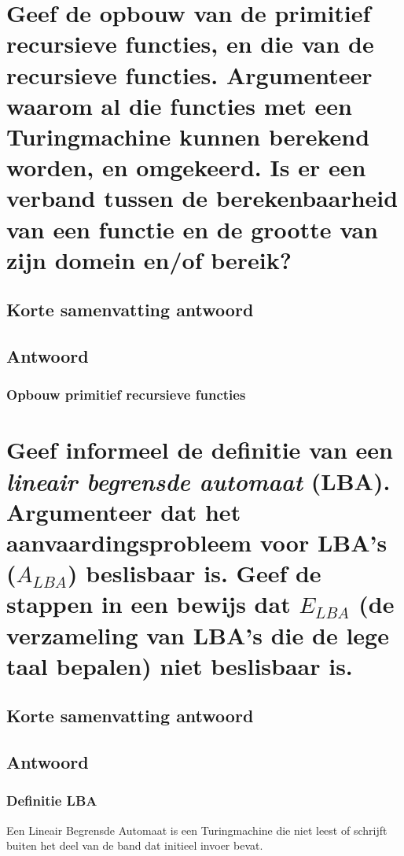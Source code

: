 \documentclass{article}
\begin{document}
\newpage
\section{Geef de opbouw van de primitief recursieve functies, en die van de recursieve functies. Argumenteer waarom al die functies met een Turingmachine kunnen berekend worden, en omgekeerd. Is er een verband tussen de berekenbaarheid van een functie en de grootte van zijn domein en/of bereik?}
    \subsection{Korte samenvatting antwoord}

    \subsection{Antwoord}
        \subsubsection{Opbouw primitief recursieve functies}


\newpage
\section{Geef informeel de definitie van een {\em lineair begrensde automaat} (LBA). Argumenteer dat het aanvaardingsprobleem voor LBA's ($A_{LBA}$) beslisbaar is. Geef de stappen in een bewijs dat $E_{LBA}$ (de verzameling van LBA's die de lege taal bepalen) niet beslisbaar is.}
    \subsection{Korte samenvatting antwoord}

    \subsection{Antwoord}
        \subsubsection{Definitie LBA}
            Een Lineair Begrensde Automaat is een Turingmachine die niet leest of schrijft buiten het deel van de band dat initieel invoer bevat.
\end{document}
